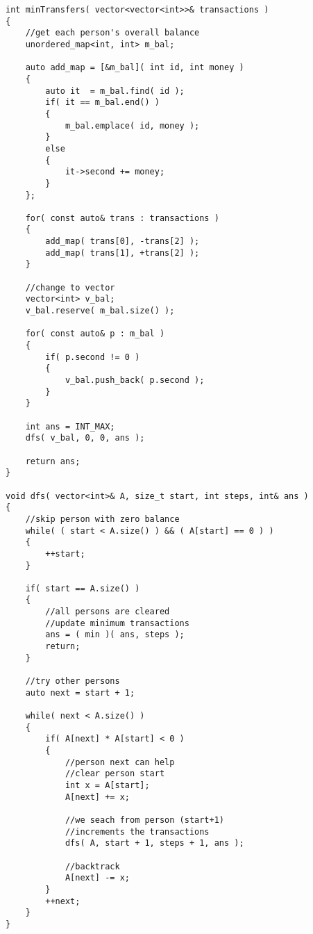 \setcounter{lstlisting}{0}
\begin{lstlisting}[style=customc, caption={DFS}]
int minTransfers( vector<vector<int>>& transactions )
{
    //get each person's overall balance
    unordered_map<int, int> m_bal;

    auto add_map = [&m_bal]( int id, int money )
    {
        auto it  = m_bal.find( id );
        if( it == m_bal.end() )
        {
            m_bal.emplace( id, money );
        }
        else
        {
            it->second += money;
        }
    };

    for( const auto& trans : transactions )
    {
        add_map( trans[0], -trans[2] );
        add_map( trans[1], +trans[2] );
    }

    //change to vector
    vector<int> v_bal;
    v_bal.reserve( m_bal.size() );

    for( const auto& p : m_bal )
    {
        if( p.second != 0 )
        {
            v_bal.push_back( p.second );
        }
    }

    int ans = INT_MAX;
    dfs( v_bal, 0, 0, ans );

    return ans;
}

void dfs( vector<int>& A, size_t start, int steps, int& ans )
{
    //skip person with zero balance
    while( ( start < A.size() ) && ( A[start] == 0 ) )
    {
        ++start;
    }

    if( start == A.size() )
    {
        //all persons are cleared
        //update minimum transactions
        ans = ( min )( ans, steps );
        return;
    }

    //try other persons
    auto next = start + 1;

    while( next < A.size() )
    {
        if( A[next] * A[start] < 0 )
        {
            //person next can help
            //clear person start
            int x = A[start];
            A[next] += x;

            //we seach from person (start+1)
            //increments the transactions
            dfs( A, start + 1, steps + 1, ans );

            //backtrack
            A[next] -= x;
        }
        ++next;
    }
}
\end{lstlisting}